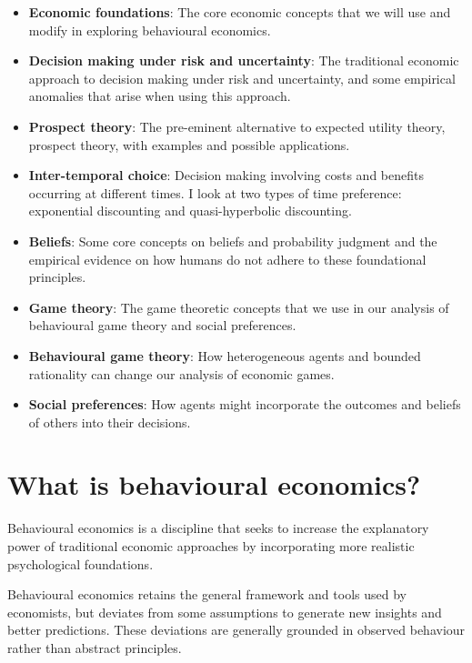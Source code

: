 \documentclass[
  letterpaper,
  DIV=11,
  numbers=noendperiod]{scrreprt}
\providecommand{\tightlist}{%
  \setlength{\itemsep}{0pt}\setlength{\parskip}{0pt}}\usepackage{longtable,booktabs,array}
\begin{document}
\begin{itemize}
\tightlist
\item
  \textbf{Economic foundations}: The core economic concepts that we will
  use and modify in exploring behavioural economics.
\item
  \textbf{Decision making under risk and uncertainty}: The traditional
  economic approach to decision making under risk and uncertainty, and
  some empirical anomalies that arise when using this approach.
\item
  \textbf{Prospect theory}: The pre-eminent alternative to expected
  utility theory, prospect theory, with examples and possible
  applications.
\item
  \textbf{Inter-temporal choice}: Decision making involving costs and
  benefits occurring at different times. I look at two types of time
  preference: exponential discounting and quasi-hyperbolic discounting.
\item
  \textbf{Beliefs}: Some core concepts on beliefs and probability
  judgment and the empirical evidence on how humans do not adhere to
  these foundational principles.
\item
  \textbf{Game theory}: The game theoretic concepts that we use in our
  analysis of behavioural game theory and social preferences.
\item
  \textbf{Behavioural game theory}: How heterogeneous agents and bounded
  rationality can change our analysis of economic games.
\item
  \textbf{Social preferences}: How agents might incorporate the outcomes
  and beliefs of others into their decisions.
\end{itemize}


\hypertarget{what-is-behavioural-economics}{%
\chapter*{What is behavioural
economics?}\label{what-is-behavioural-economics}}


Behavioural economics is a discipline that seeks to increase the
explanatory power of traditional economic approaches by incorporating
more realistic psychological foundations.

Behavioural economics retains the general framework and tools used by
economists, but deviates from some assumptions to generate new insights
and better predictions. These deviations are generally grounded in
observed behaviour rather than abstract principles.
\end{document}
